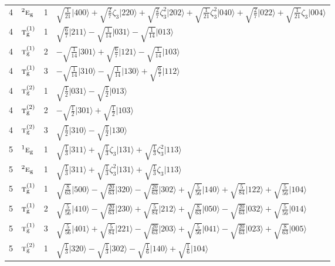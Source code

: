 \documentclass[11pt]{article}
\newcommand{\irr}[1]{\text{\normalfont\scshape #1}}
\newcommand{\conjpair}[1]{{}^{#1}}
\newcommand{\ptag}[1]{\mathrm{#1}}
\newcommand{\rootunity}[1]{\zeta_{#1}}
\newcommand{\occ}[1]{\lvert #1\rangle}
\begin{document}
\begin{longtable}{c l c p{}}
4 & $\conjpair{2}\irr{e}_{\ptag{g}}$ & 1 & $\sqrt{\tfrac{1}{21}}\occ{400}+\sqrt{\tfrac{2}{7}}\rootunity{3}\occ{220}+\sqrt{\tfrac{2}{7}}\rootunity{3}^{2}\occ{202}+\sqrt{\tfrac{1}{21}}\rootunity{3}^{2}\occ{040}+\sqrt{\tfrac{2}{7}}\occ{022}+\sqrt{\tfrac{1}{21}}\rootunity{3}\occ{004}$\\
4 & $\irr{t}_{\ptag{g}}^{(1)}$ & 1 & $\sqrt{\tfrac{6}{7}}\occ{211}-\sqrt{\tfrac{1}{14}}\occ{031}-\sqrt{\tfrac{1}{14}}\occ{013}$\\
4 & $\irr{t}_{\ptag{g}}^{(1)}$ & 2 & $-\sqrt{\tfrac{1}{14}}\occ{301}+\sqrt{\tfrac{6}{7}}\occ{121}-\sqrt{\tfrac{1}{14}}\occ{103}$\\
4 & $\irr{t}_{\ptag{g}}^{(1)}$ & 3 & $-\sqrt{\tfrac{1}{14}}\occ{310}-\sqrt{\tfrac{1}{14}}\occ{130}+\sqrt{\tfrac{6}{7}}\occ{112}$\\
4 & $\irr{t}_{\ptag{g}}^{(2)}$ & 1 & $\sqrt{\tfrac{1}{2}}\occ{031}-\sqrt{\tfrac{1}{2}}\occ{013}$\\
4 & $\irr{t}_{\ptag{g}}^{(2)}$ & 2 & $-\sqrt{\tfrac{1}{2}}\occ{301}+\sqrt{\tfrac{1}{2}}\occ{103}$\\
4 & $\irr{t}_{\ptag{g}}^{(2)}$ & 3 & $\sqrt{\tfrac{1}{2}}\occ{310}-\sqrt{\tfrac{1}{2}}\occ{130}$\\
\hline
5 & $\conjpair{1}\irr{e}_{\ptag{g}}$ & 1 & $\sqrt{\tfrac{1}{3}}\occ{311}+\sqrt{\tfrac{1}{3}}\rootunity{3}\occ{131}+\sqrt{\tfrac{1}{3}}\rootunity{3}^{2}\occ{113}$\\
5 & $\conjpair{2}\irr{e}_{\ptag{g}}$ & 1 & $\sqrt{\tfrac{1}{3}}\occ{311}+\sqrt{\tfrac{1}{3}}\rootunity{3}^{2}\occ{131}+\sqrt{\tfrac{1}{3}}\rootunity{3}\occ{113}$\\
5 & $\irr{t}_{\ptag{g}}^{(1)}$ & 1 & $\sqrt{\tfrac{8}{63}}\occ{500}-\sqrt{\tfrac{20}{63}}\occ{320}-\sqrt{\tfrac{20}{63}}\occ{302}+\sqrt{\tfrac{5}{56}}\occ{140}+\sqrt{\tfrac{5}{84}}\occ{122}+\sqrt{\tfrac{5}{56}}\occ{104}$\\
5 & $\irr{t}_{\ptag{g}}^{(1)}$ & 2 & $\sqrt{\tfrac{5}{56}}\occ{410}-\sqrt{\tfrac{20}{63}}\occ{230}+\sqrt{\tfrac{5}{84}}\occ{212}+\sqrt{\tfrac{8}{63}}\occ{050}-\sqrt{\tfrac{20}{63}}\occ{032}+\sqrt{\tfrac{5}{56}}\occ{014}$\\
5 & $\irr{t}_{\ptag{g}}^{(1)}$ & 3 & $\sqrt{\tfrac{5}{56}}\occ{401}+\sqrt{\tfrac{5}{84}}\occ{221}-\sqrt{\tfrac{20}{63}}\occ{203}+\sqrt{\tfrac{5}{56}}\occ{041}-\sqrt{\tfrac{20}{63}}\occ{023}+\sqrt{\tfrac{8}{63}}\occ{005}$\\
5 & $\irr{t}_{\ptag{g}}^{(2)}$ & 1 & $\sqrt{\tfrac{1}{3}}\occ{320}-\sqrt{\tfrac{1}{3}}\occ{302}-\sqrt{\tfrac{1}{6}}\occ{140}+\sqrt{\tfrac{1}{6}}\occ{104}$\\

\end{longtable}
\end{document}
